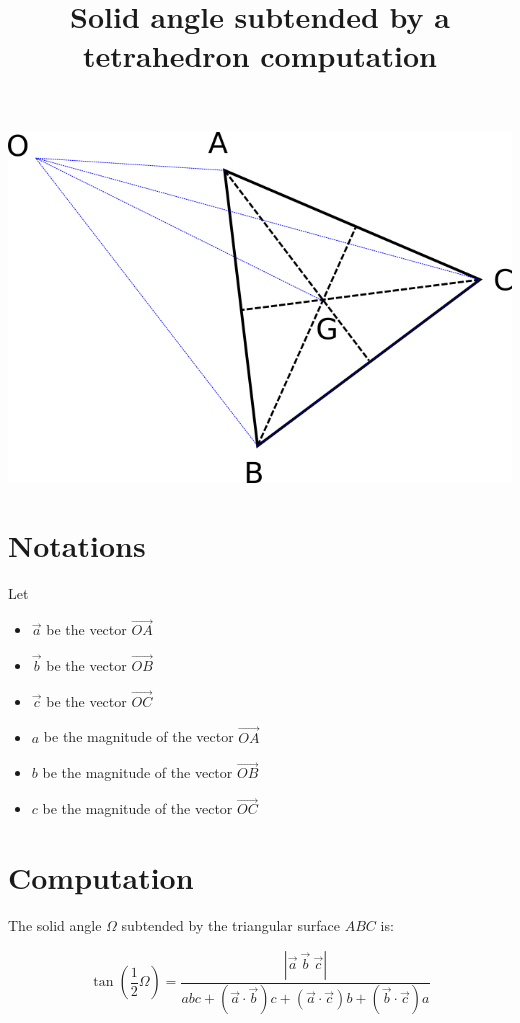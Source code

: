 \documentclass[10pt,a4paper]{article}
\title{Solid angle subtended by a tetrahedron computation}
\begin{document}
\maketitle


\includegraphics[scale=0.4]{tetra.png} 


\section{Notations}

Let

\begin{itemize}
	\item $\vec{a}$ be the vector $\vec{OA}$
	\item $\vec{b}$ be the vector $\vec{OB}$
	\item $\vec{c}$ be the vector $\vec{OC}$
	\item $a$ be the magnitude of the vector $\vec{OA}$
	\item $b$ be the magnitude of the vector $\vec{OB}$
	\item $c$ be the magnitude of the vector $\vec{OC}$
\end{itemize}

\section{Computation}

The solid angle $\Omega$ subtended by the triangular surface $ABC$ is:

$$
{\displaystyle \tan \left({\frac {1}{2}}\Omega \right)
  = {\frac {\left|{\vec {a}}\ {\vec {b}}\ {\vec {c}}\right|}
    {abc + \left({\vec {a}}\cdot {\vec {b}}\right)c
      + \left({\vec {a}}\cdot {\vec {c}}\right)b
      + \left({\vec {b}}\cdot {\vec {c}}\right)a}}}
$$
\end{document}
